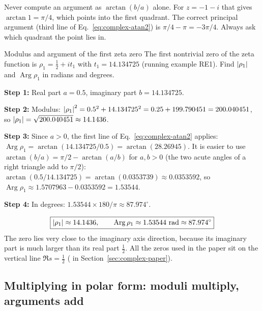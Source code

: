 \begin{pitfall}
Never compute an argument as $\arctan(b/a)$ alone. For $z=-1-i$ that gives $\arctan 1=\pi/4$, which points into the first quadrant. The correct principal argument (third line of Eq.~\eqref{eq:complex-atan2}) is $\pi/4-\pi=-3\pi/4$. Always ask which quadrant the point lies in.
\end{pitfall}

\begin{sample}{Modulus and argument of the first zeta zero}
The first nontrivial zero of the zeta function is $\rho_1=\tfrac12+it_1$ with $t_1=14.134725$ (running example RE1). Find $\left\lvert \rho_1\right\rvert$ and $\operatorname{Arg}\rho_1$ in radians and degrees.

\textbf{Step 1:} Real part $a=0.5$, imaginary part $b=14.134725$.

\textbf{Step 2:} Modulus: $\left\lvert \rho_1\right\rvert^2=0.5^2+14.134725^2=0.25+199.790451=200.040451$, so $\left\lvert \rho_1\right\rvert=\sqrt{200.040451}\approx14.1436$.

\textbf{Step 3:} Since $a>0$, the first line of Eq.~\eqref{eq:complex-atan2} applies: $\operatorname{Arg}\rho_1=\arctan(14.134725/0.5)=\arctan(28.26945)$. It is easier to use $\arctan(b/a)=\pi/2-\arctan(a/b)$ for $a,b>0$ (the two acute angles of a right triangle add to $\pi/2$): $\arctan(0.5/14.134725)=\arctan(0.0353739)\approx0.0353592$, so $\operatorname{Arg}\rho_1\approx1.5707963-0.0353592=1.53544$.

\textbf{Step 4:} In degrees: $1.53544\times180/\pi\approx87.974^\circ$.

\[
\boxed{\abs{\rho_1}\approx14.1436,\qquad \operatorname{Arg}\rho_1\approx1.53544\ \text{rad}\approx87.974^\circ}
\]
The zero lies very close to the imaginary axis direction, because its imaginary part is much larger than its real part $\tfrac12$. All the zeros used in the paper sit on the vertical line $\Re s=\tfrac12$ ( in Section~\ref{sec:complex-paper}).
\end{sample}

\subsection{Multiplying in polar form: moduli multiply, arguments add}

